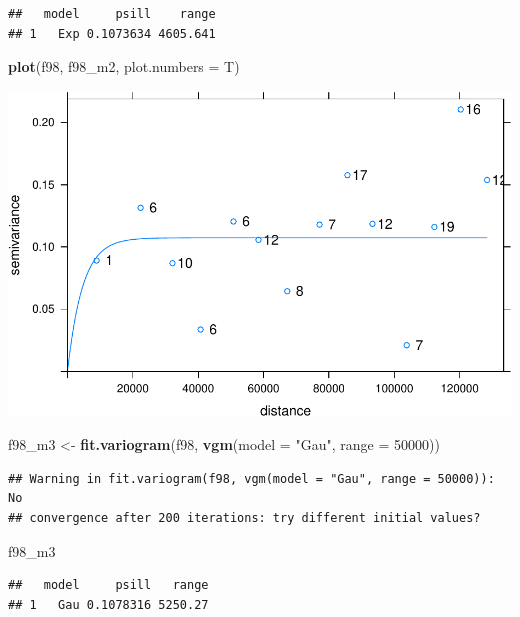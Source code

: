 \documentclass[11pt,]{article}
\newenvironment{Shaded}{\begin{snugshade}}{\end{snugshade}}
\newcommand{\KeywordTok}[1]{\textcolor[rgb]{0.13,0.29,0.53}{\textbf{#1}}}
\newcommand{\DataTypeTok}[1]{\textcolor[rgb]{0.13,0.29,0.53}{#1}}
\newcommand{\DecValTok}[1]{\textcolor[rgb]{0.00,0.00,0.81}{#1}}
\newcommand{\StringTok}[1]{\textcolor[rgb]{0.31,0.60,0.02}{#1}}
\newcommand{\NormalTok}[1]{#1}
\begin{document}
\begin{verbatim}
##   model     psill    range
## 1   Exp 0.1073634 4605.641
\end{verbatim}

\begin{Shaded}
\begin{Highlighting}[]
\KeywordTok{plot}\NormalTok{(f98, f98_m2, }\DataTypeTok{plot.numbers =}\NormalTok{ T)}
\end{Highlighting}
\end{Shaded}

\includegraphics{proyecto_Superficie_Continua_files/figure-latex/unnamed-chunk-8-2.pdf}

\begin{Shaded}
\begin{Highlighting}[]
\NormalTok{f98_m3 <-}\StringTok{ }\KeywordTok{fit.variogram}\NormalTok{(f98, }\KeywordTok{vgm}\NormalTok{(}\DataTypeTok{model =} \StringTok{"Gau"}\NormalTok{, }\DataTypeTok{range =} \DecValTok{50000}\NormalTok{))}
\end{Highlighting}
\end{Shaded}

\begin{verbatim}
## Warning in fit.variogram(f98, vgm(model = "Gau", range = 50000)): No
## convergence after 200 iterations: try different initial values?
\end{verbatim}

\begin{Shaded}
\begin{Highlighting}[]
\NormalTok{f98_m3}
\end{Highlighting}
\end{Shaded}

\begin{verbatim}
##   model     psill   range
## 1   Gau 0.1078316 5250.27
\end{verbatim}
\end{document}
